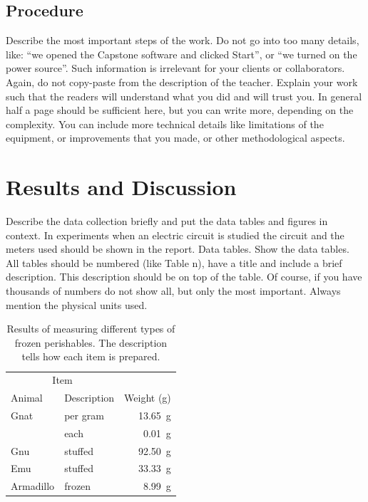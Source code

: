 \documentclass{scrartcl}
\begin{document}
\subsection{Procedure} %

Describe the most important steps of the work.
Do not go into too many details, like: “we opened the Capstone software and clicked Start”, or “we turned on the power source”. \cite{abook} %
Such information is irrelevant for your clients or collaborators.
Again, do not copy-paste from the description of the teacher.
Explain your work such that the readers will understand what you did and will trust you.
In general half a page should be sufficient here, but you can write more, depending on the complexity.
You can include more technical details like limitations of the equipment, or improvements that you made, or other methodological aspects.

\section{Results and Discussion} %

Describe the data collection briefly and put the data tables and figures in context.
In experiments when an electric circuit is studied the circuit and the meters used should be shown in the report.
Data tables.
Show the data tables.
All tables should be numbered (like Table n), have a title and include a brief description.
This description should be on top of the table. Of course, if you have thousands of numbers do not show all, but only the most important.
Always mention the physical units used.

\begin{table}[ht] %
    \centering
    \begin{tabular}{llr} %
\hline
\multicolumn{2}{c}{Item} \\ %
\cline{1-2}
Animal    & Description & Weight (\si{\gram}) \\
\hline %
Gnat      & per gram    & \SI{13.65}{\gram}      \\ %
          & each        & \SI{0.01}{\gram}       \\ %
Gnu       & stuffed     & \SI{92.50}{\gram}      \\
Emu       & stuffed     & \SI{33.33}{\gram}      \\
Armadillo & frozen      & \SI{8.99}{\gram}       \\
\hline
\end{tabular}
    \caption{Results of measuring different types of frozen perishables.
    The description tells how each item is prepared.}
    \label{tab:my_label}
\end{table}
\end{document}
